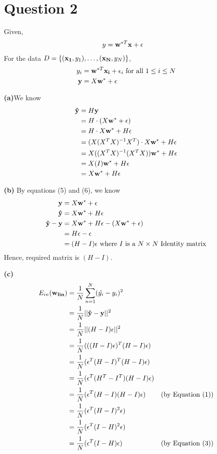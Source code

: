 \documentclass[12pt]{article}
\newcommand{\e}[0]{\epsilon}
\begin{document}

\section*{Question 2}
Given,
\begin{align*}
    y & = {\bf w}^{*T}{\bf x} + \e
\end{align*}
For the data \(D = \{({\bf x_1},y_1),\ldots ,({\bf x_N},y_N)\}\),
\begin{align}
\nonumber
    y_i & = {\bf w}^{*T}{\bf x_i} + \e_i \text{ for all \(1 \le i \le N\)}\\ 
    {\bf y} & = {X}{\bf w^*} + {\bf \e}
\end{align}

\textbf{(a)}We know
\begin{align}\nonumber
    {\bf \hat{y}} & = {H\bf{y}}\\\nonumber
    & = {H} \cdot ({X}{\bf w^*} + {\bf \e})\\\nonumber
    & = H\cdot X{\bf w^*} + {H}\e\\\nonumber
    & = (X(X^TX)^{-1}X^T)\cdot X{\bf w^*} + {H}\e\\\nonumber
    & = X((X^TX)^{-1}(X^TX)){\bf w^*} + {H}\e\\\nonumber
    & = X(I){\bf w^*} + {H}\e\\
    & = X{\bf w^*} + {H}\e
\end{align}

\textbf{(b)} By equations (5) and (6), we know
\begin{align}\nonumber
    {\mathbf{y}} & = {X}{\bf w^*} + {\bf \e} \\\nonumber
    {\bf \hat{y}} & = X{\bf w^*} + {H}\e\\\nonumber
        {\bf \hat{y}} - {\bf y} & = X{\bf w^*} + {H}\e - ({X}{\bf w^*} + {\bf \e})\\\nonumber
        & = H\e - \e\\
        & = (H-I)\e \text{ where \(I\) is a \(N \times N\) Identity matrix}
\end{align}
Hence, required matrix is \((H-I)\).

\textbf{(c)}
\begin{align}\nonumber
    E_{in}({\bf w_{lin}}) & = \frac{1}{N} \sum_{n=1}^N (\hat{y_i} - y_i)^2 \\ \nonumber
    & = \frac{1}{N} ||{\bf \hat{y}} - {\bf y}||^2 \\ \nonumber
    & = \frac{1}{N}||(H-I)\e||^2 \\ \nonumber
    & = \frac{1}{N} (((H-I)\e)^T(H-I)\e) \\ \nonumber
    & = \frac{1}{N} (\e^T(H-I)^T(H-I)\e) \\ \nonumber
    & = \frac{1}{N} (\e^T(H^T-I^T)(H-I)\e) \\ \nonumber
    & = \frac{1}{N} (\e^T(H-I)(H-I)\e) & (\text{by Equation (1)})\\ \nonumber
    & = \frac{1}{N} (\e^T(H-I)^2\e) \\ \nonumber
    & = \frac{1}{N} (\e^T(I-H)^2\e) \\ 
    & = \frac{1}{N} (\e^T(I-H)\e) & (\text{by Equation (3)})
\end{align}
\end{document}
